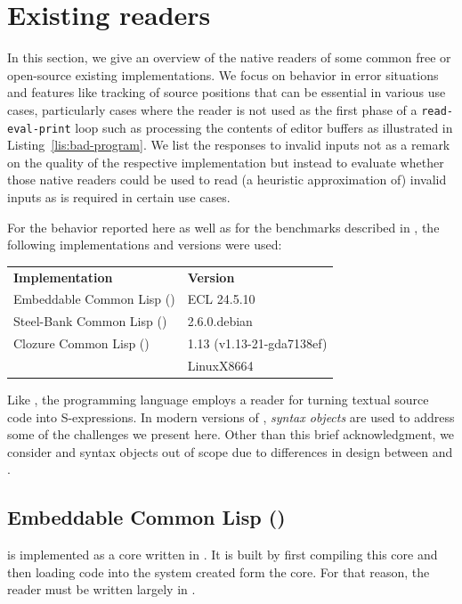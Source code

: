 \section{Existing \cl{} readers}

In this section, we give an overview of the native readers of some
common free or open-source existing \cl{} implementations.  We focus
on behavior in error situations and features like tracking of source
positions that can be essential in various use cases, particularly
cases where the reader is not used as the first phase of a
\texttt{read-eval-print} loop such as processing the contents of
editor buffers as illustrated in Listing~\ref{lis:bad-program}.  We
list the responses to invalid inputs not as a remark on the quality of
the respective implementation but instead to evaluate whether those
native readers could be used to read (a heuristic approximation of)
invalid inputs as is required in certain use cases.

For the behavior reported here as well as for the benchmarks described
in , the following implementations and
versions were used:

\vspace{1em}\noindent%
\begin{tabular}{ll}
  \textbf{Implementation}          & \textbf{Version}\\
  Embeddable Common Lisp (\ecl{})  & ECL 24.5.10\\
  Steel-Bank Common Lisp (\sbcl{}) & 2.6.0.debian\\
  Clozure Common Lisp (\ccl{})     & 1.13 (v1.13-21-gda7138ef)\\
                                   & LinuxX8664
\end{tabular}
\vspace{1em}

Like \cl{}, the \scheme{} programming language employs a reader for
turning textual source code into S-expressions.  In modern versions of
\scheme{}, \emph{syntax objects} are used to address some of the
challenges we present here.  Other than this brief acknowledgment, we
consider \scheme{} and syntax objects out of scope due to differences
in design between \scheme{} and \cl{}.

\subsection{Embeddable Common Lisp (\ecl{})}

\ecl{} is implemented as a core written in \clanguage{}.  It is built
by first compiling this core and then loading \cl{} code into the
system created form the core.  For that reason, the reader must be
written largely in \clanguage{}.

